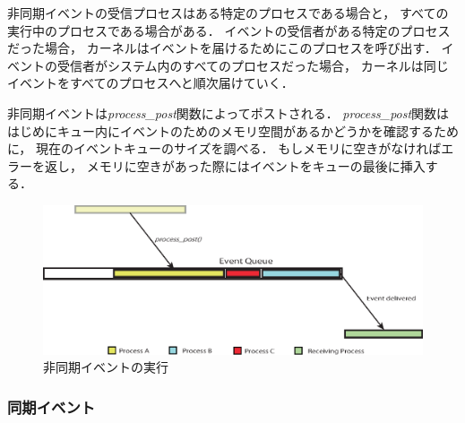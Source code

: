 非同期イベントの受信プロセスはある特定のプロセスである場合と，
すべての実行中のプロセスである場合がある．
イベントの受信者がある特定のプロセスだった場合，
カーネルはイベントを届けるためにこのプロセスを呼び出す．
イベントの受信者がシステム内のすべてのプロセスだった場合，
カーネルは同じイベントをすべてのプロセスへと順次届けていく．

非同期イベントは{\it process\_post}関数によってポストされる．
{\it process\_post}関数ははじめにキュー内にイベントのためのメモリ空間があるかどうかを確認するために，
現在のイベントキューのサイズを調べる．
もしメモリに空きがなければエラーを返し，
メモリに空きがあった際にはイベントをキューの最後に挿入する．


\begin{figure}[htbp]
 \begin{center}
  \includegraphics[width=115mm]{./images/asynchronous_event.eps}
 \end{center}
 \caption{非同期イベントの実行}
 \label{fig:asynchronous_event}
\end{figure}




\subsubsection{同期イベント}

